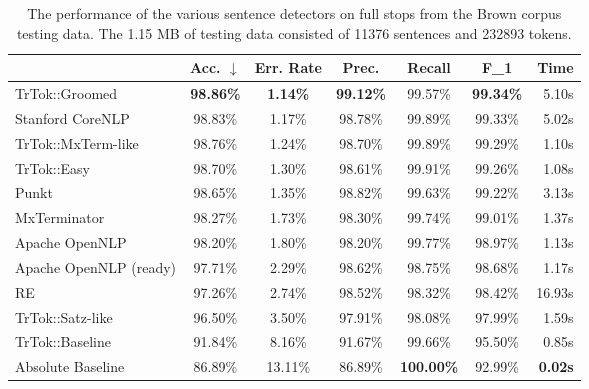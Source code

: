 \begin{table}
  \small
  \begin{center}
    \begin{tabular}{ | l | c | c | c | c | c | r | }
      \hline
      & Acc. $\downarrow$ & Err. Rate & Prec.
      & Recall & F_1 & Time \\ \hline
      TrTok::Groomed & \textbf{98.86\%} & \textbf{1.14\%} & \textbf{99.12\%}
                     & 99.57\% & \textbf{99.34\%} & 5.10s \\ \hline
      Stanford CoreNLP & 98.83\% & 1.17\% & 98.78\%
                       & 99.89\% & 99.33\% & 5.02s \\ \hline
      TrTok::MxTerm-like & 98.76\% & 1.24\% & 98.70\%
                         & 99.89\% & 99.29\% & 1.10s \\ \hline
      TrTok::Easy & 98.70\% & 1.30\% & 98.61\%
                  & 99.91\% & 99.26\% & 1.08s \\ \hline
      Punkt & 98.65\% & 1.35\% & 98.82\%
            & 99.63\% & 99.22\% & 3.13s \\ \hline
      MxTerminator & 98.27\% & 1.73\% & 98.30\%
                   & 99.74\% & 99.01\% & 1.37s \\ \hline
      Apache OpenNLP & 98.20\% & 1.80\% & 98.20\%
                     & 99.77\% & 98.97\% & 1.13s \\ \hline
      Apache OpenNLP (ready) & 97.71\% & 2.29\% & 98.62\%
                             & 98.75\% & 98.68\% & 1.17s \\ \hline
      RE & 97.26\% & 2.74\% & 98.52\%
         & 98.32\% & 98.42\% & 16.93s \\ \hline
      TrTok::Satz-like & 96.50\% & 3.50\% & 97.91\%
                       & 98.08\% & 97.99\% & 1.59s \\ \hline
      TrTok::Baseline & 91.84\% & 8.16\% & 91.67\%
                      & 99.66\% & 95.50\% & 0.85s \\ \hline
      Absolute Baseline & 86.89\% & 13.11\% & 86.89\%
                        & \textbf{100.00\%} & 92.99\% & \textbf{0.02s} \\ \hline
    \end{tabular}
  \end{center}
  \caption[Performance of sentence detectors on the Brown corpus] {The
    performance of the various sentence detectors on full stops from
    the Brown corpus testing data. The 1.15 MB of testing data
    consisted of 11376 sentences and 232893 tokens.}
  \label{tbl:grand-melee}
\end{table}

